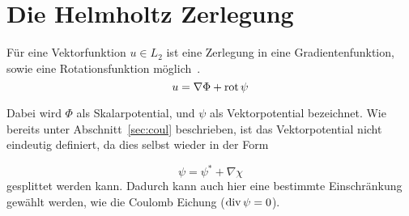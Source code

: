 \section{Die Helmholtz Zerlegung}
Für eine Vektorfunktion $u\in L_2$ ist eine Zerlegung in eine Gradientenfunktion, sowie eine Rotationsfunktion m\"oglich~\cite{Schberl2009NumericalMF}.
\begin{equation}
	u = \nabla\Phi + \mathrm{rot}\,\psi
\end{equation}
\par
Dabei wird $\Phi$ als Skalarpotential, und $\psi$ als Vektorpotential bezeichnet. Wie bereits unter Abschnitt~\ref{sec:coul} beschrieben, ist das Vektorpotential nicht eindeutig definiert, da dies selbst wieder in der Form
\par
\begin{equation}
	\psi = \psi^{*} + \nabla\chi 
\end{equation}
gesplittet werden kann. Dadurch kann auch hier eine bestimmte Einschr\"ankung gew\"ahlt werden, wie die Coulomb Eichung ($\mathrm{div}\, \psi = 0$).